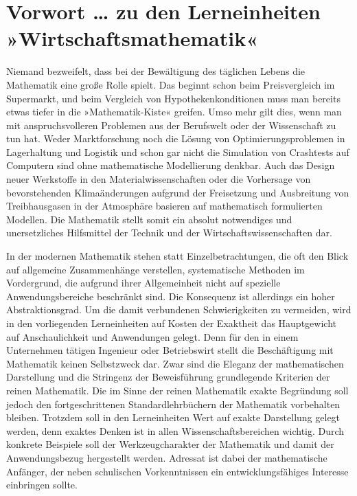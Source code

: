 \chapter*{Vorwort … zu den Lerneinheiten »Wirtschaftsmathematik«}

Niemand bezweifelt, dass bei der Bewältigung des täglichen Lebens die Mathematik eine große Rolle spielt. Das beginnt schon beim Preisvergleich im Supermarkt, und beim Vergleich von Hypothekenkonditionen muss man bereits etwas tiefer in die »Mathematik-Kiste« greifen. Umso mehr gilt dies, wenn man mit anspruchsvolleren Problemen aus der Berufswelt oder der Wissenschaft zu tun hat. Weder Marktforschung noch die Lösung von Optimierungsproblemen in Lagerhaltung und Logistik und schon gar nicht die Simulation von Crashtests auf Computern sind ohne mathematische Modellierung denkbar. Auch das Design neuer Werkstoffe in den Materialwissenschaften oder die Vorhersage von bevorstehenden Klimaänderungen aufgrund der Freisetzung und Ausbreitung von Treibhausgasen in der Atmosphäre basieren auf mathematisch formulierten Modellen. Die Mathematik stellt somit ein absolut notwendiges und unersetzliches Hilfsmittel der Technik und der Wirtschaftswissenschaften dar.

In der modernen Mathematik stehen statt Einzelbetrachtungen, die oft den Blick auf allgemeine Zusammenhänge verstellen, systematische Methoden im Vordergrund, die aufgrund ihrer Allgemeinheit nicht auf spezielle Anwendungsbereiche beschränkt sind. Die Konsequenz ist allerdings ein hoher Abstraktionsgrad. Um die damit verbundenen Schwierigkeiten zu vermeiden, wird in den vorliegenden Lerneinheiten auf Kosten der Exaktheit das Hauptgewicht auf Anschaulichkeit und Anwendungen gelegt. Denn für den in einem Unternehmen tätigen Ingenieur oder Betriebswirt stellt die Beschäftigung mit Mathematik keinen Selbstzweck dar. Zwar sind die Eleganz der mathematischen Darstellung und die Stringenz der Beweisführung grundlegende Kriterien der reinen Mathematik. Die im Sinne der reinen Mathematik exakte Begründung soll jedoch den fortgeschrittenen Standardlehrbüchern der Mathematik vorbehalten bleiben. Trotzdem soll in den Lerneinheiten Wert auf exakte Darstellung gelegt werden, denn exaktes Denken ist in allen Wissenschaftsbereichen wichtig. Durch konkrete Beispiele soll der Werkzeugcharakter der Mathematik und damit der Anwendungsbezug hergestellt werden. Adressat ist dabei der mathematische Anfänger, der neben schulischen Vorkenntnissen ein entwicklungsfähiges Interesse einbringen sollte.

